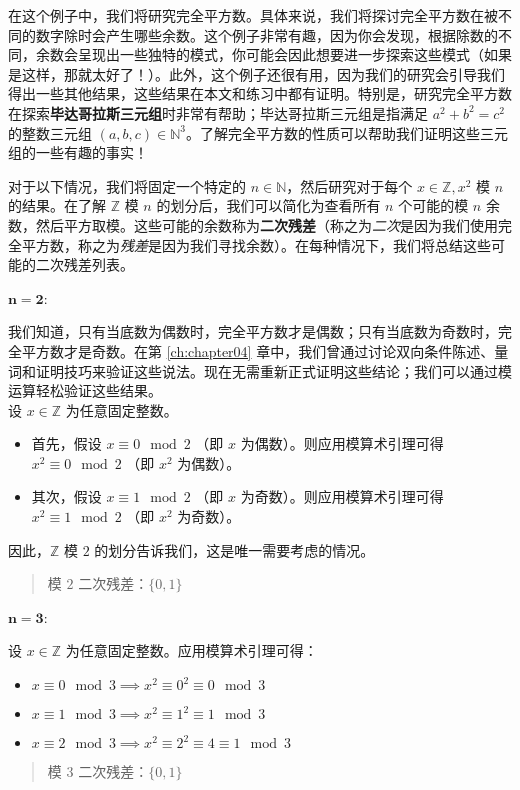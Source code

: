 \begin{example}[二次残差]\label{ex:example6.5.15}

    在这个例子中，我们将研究完全平方数。具体来说，我们将探讨完全平方数在被不同的数字除时会产生哪些余数。这个例子非常有趣，因为你会发现，根据除数的不同，余数会呈现出一些独特的模式，你可能会因此想要进一步探索这些模式（如果是这样，那就太好了！）。此外，这个例子还很有用，因为我们的研究会引导我们得出一些其他结果，这些结果在本文和练习中都有证明。特别是，研究完全平方数在探索\textbf{毕达哥拉斯三元组}时非常有帮助；毕达哥拉斯三元组是指满足 $a^2 + b^2 = c^2$ 的整数三元组 $(a, b, c) \in \mathbb{N}^3$。了解完全平方数的性质可以帮助我们证明这些三元组的一些有趣的事实！

    对于以下情况，我们将固定一个特定的 $n \in \mathbb{N}$，然后研究对于每个 $x \in \mathbb{Z}, x^2$ 模 $n$ 的结果。在了解 $\mathbb{Z}$ 模 $n$ 的划分后，我们可以简化为查看所有 $n$ 个可能的模 $n$ 余数，然后平方取模。这些可能的余数称为\textbf{二次残差}（称之为\emph{二次}是因为我们使用完全平方数，称之为\emph{残差}是因为我们寻找余数）。在每种情况下，我们将总结这些可能的二次残差列表。

    $\mathbf{n=2}$:

    我们知道，只有当底数为偶数时，完全平方数才是偶数；只有当底数为奇数时，完全平方数才是奇数。在第 \ref{ch:chapter04} 章中，我们曾通过讨论双向条件陈述、量词和证明技巧来验证这些说法。现在无需重新正式证明这些结论；我们可以通过模运算轻松验证这些结果。\\
    设 $x \in \mathbb{Z}$ 为任意固定整数。
    \begin{itemize}
        \item 首先，假设 $x \equiv 0 \mod 2$ （即 $x$ 为偶数）。则应用模算术引理可得 $x^2 \equiv 0 \mod 2$ （即 $x^2$ 为偶数）。
        \item 其次，假设 $x \equiv 1 \mod 2$ （即 $x$ 为奇数）。则应用模算术引理可得 $x^2 \equiv 1 \mod 2$ （即 $x^2$ 为奇数）。
    \end{itemize}
    因此，$\mathbb{Z}$ 模 $2$ 的划分告诉我们，这是唯一需要考虑的情况。
    \begin{quotation}
        \begin{center}
            \large 模 $2$ 二次残差：$\{0, 1\}$
        \end{center}
    \end{quotation}

    $\mathbf{n=3}$: 

    设 $x \in \mathbb{Z}$ 为任意固定整数。应用模算术引理可得：
    \begin{itemize}
        \item $x \equiv 0 \mod 3 \implies x^2 \equiv 0^2 \equiv 0 \mod 3$
        \item $x \equiv 1 \mod 3 \implies x^2 \equiv 1^2 \equiv 1 \mod 3$
        \item $x \equiv 2 \mod 3 \implies x^2 \equiv 2^2 \equiv 4 \equiv 1 \mod 3$
    \end{itemize}
    \begin{quotation}
        \begin{center}
            \large 模 $3$ 二次残差：$\{0, 1\}$
        \end{center}
    \end{quotation}


\end{example}
